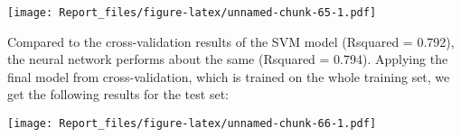 \documentclass[
]{article}
\newenvironment{Shaded}{\begin{snugshade}}{\end{snugshade}}
\newcommand{\AttributeTok}[1]{\textcolor[rgb]{0.13,0.29,0.53}{#1}}
\newcommand{\ConstantTok}[1]{\textcolor[rgb]{0.56,0.35,0.01}{#1}}
\newcommand{\DecValTok}[1]{\textcolor[rgb]{0.00,0.00,0.81}{#1}}
\newcommand{\FunctionTok}[1]{\textcolor[rgb]{0.13,0.29,0.53}{\textbf{#1}}}
\newcommand{\NormalTok}[1]{#1}
\newcommand{\OtherTok}[1]{\textcolor[rgb]{0.56,0.35,0.01}{#1}}
\newcommand{\SpecialCharTok}[1]{\textcolor[rgb]{0.81,0.36,0.00}{\textbf{#1}}}
\newcommand{\StringTok}[1]{\textcolor[rgb]{0.31,0.60,0.02}{#1}}
\begin{document}
\begin{Shaded}
\end{Shaded}

\texttt{[image: Report\_files/figure-latex/unnamed-chunk-65-1.pdf]}

Compared to the cross-validation results of the SVM model (Rsquared =
0.792), the neural network performs about the same (Rsquared = 0.794).
Applying the final model from cross-validation, which is trained on the
whole training set, we get the following results for the test set:

\begin{Shaded}
\end{Shaded}

\texttt{[image: Report\_files/figure-latex/unnamed-chunk-66-1.pdf]}
\end{document}
